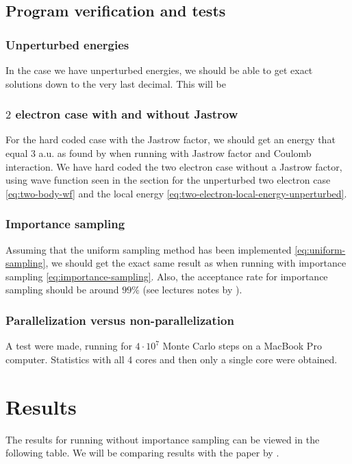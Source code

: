 \documentclass[11pt]{article}
\begin{document}
\subsection{Program verification and tests}
\subsubsection{Unperturbed energies}
In the case we have unperturbed energies, we should be able to get exact solutions down to the very last decimal. This will be 

\subsubsection{\texorpdfstring{$2$}{a} electron case with and without Jastrow}
For the hard coded case with the Jastrow factor, we should get an energy that equal 3 a.u. as found by \citet{PhysRevA.48.3561} when running with Jastrow factor and Coulomb interaction. We have hard coded the two electron case without a Jastrow factor, using wave function seen in the section for the unperturbed two electron case \eqref{eq:two-body-wf} and the local energy \eqref{eq:two-electron-local-energy-unperturbed}.

\subsubsection{Importance sampling}
Assuming that the uniform sampling method has been implemented \eqref{eq:uniform-sampling}, we should get the exact same result as when running with importance sampling \eqref{eq:importance-sampling}. Also, the acceptance rate for importance sampling should be around $99\%$ (see lectures notes by \citet{komp2015}).

\subsubsection{Parallelization versus non-parallelization}
A test were made, running for $4\cdot 10^7$ Monte Carlo steps on a MacBook Pro computer. Statistics with all 4 cores and then only a single core were obtained.





\section{Results}
The results for running without importance sampling can be viewed in the following table. We will be comparing results with the paper by \citet{PhysRevB.84.115302}.
\end{document}
